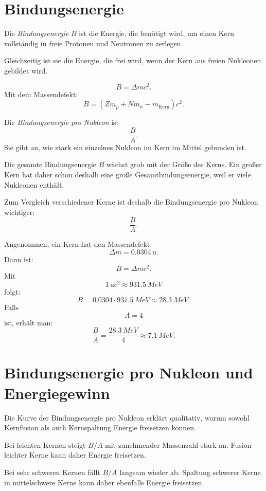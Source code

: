 \section{Bindungsenergie}

\begin{definitionbox}
Die \emph{Bindungsenergie} $B$ ist die Energie, die benötigt wird, um einen Kern
vollständig in freie Protonen und Neutronen zu zerlegen.

Gleichzeitig ist sie die Energie, die frei wird, wenn der Kern aus freien Nukleonen
gebildet wird.
\end{definitionbox}

\begin{formulabox}
\[
    B = \Delta m c^2.
\]
Mit dem Massendefekt:
\[
    B =
    \left(
        Zm_p + Nm_n - m_{\mathrm{Kern}}
    \right)c^2.
\]
\end{formulabox}

\begin{definitionbox}
Die \emph{Bindungsenergie pro Nukleon} ist
\[
    \frac{B}{A}.
\]
Sie gibt an, wie stark ein einzelnes Nukleon im Kern im Mittel gebunden ist.
\end{definitionbox}

\begin{conceptbox}
Die gesamte Bindungsenergie $B$ wächst grob mit der Größe des Kerns.
Ein großer Kern hat daher schon deshalb eine große Gesamtbindungsenergie, weil er
viele Nukleonen enthält.

Zum Vergleich verschiedener Kerne ist deshalb die Bindungsenergie pro Nukleon
wichtiger:
\[
    \frac{B}{A}.
\]
\end{conceptbox}

\begin{examplebox}
Angenommen, ein Kern hat den Massendefekt
\[
    \Delta m = 0.0304\,\mathrm{u}.
\]
Dann ist:
\[
    B = \Delta m c^2.
\]
Mit
\[
    1\,\mathrm{u}c^2 \approx \SI{931.5}{MeV}
\]
folgt:
\[
    B = 0.0304 \cdot \SI{931.5}{MeV}
      \approx \SI{28.3}{MeV}.
\]
Falls
\[
    A=4
\]
ist, erhält man:
\[
    \frac{B}{A}
    =
    \frac{\SI{28.3}{MeV}}{4}
    \approx \SI{7.1}{MeV}.
\]
\end{examplebox}

\section{Bindungsenergie pro Nukleon und Energiegewinn}

\begin{conceptbox}
Die Kurve der Bindungsenergie pro Nukleon erklärt qualitativ, warum sowohl
Kernfusion als auch Kernspaltung Energie freisetzen können.

Bei leichten Kernen steigt $B/A$ mit zunehmender Massenzahl stark an.
Fusion leichter Kerne kann daher Energie freisetzen.

Bei sehr schweren Kernen fällt $B/A$ langsam wieder ab.
Spaltung schwerer Kerne in mittelschwere Kerne kann daher ebenfalls Energie freisetzen.
\end{conceptbox}

